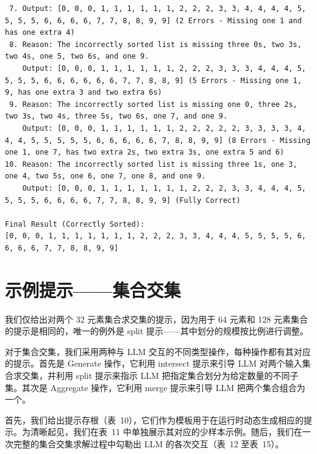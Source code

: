 \documentclass[11pt,UTF8,fontset=fandol]{ctexart}
\begin{document}
\begin{lstlisting}
 7. Output: [0, 0, 0, 1, 1, 1, 1, 1, 1, 2, 2, 2, 3, 3, 4, 4, 4, 4, 5, 5, 5, 5, 6, 6, 6, 6, 7, 7, 8, 8, 9, 9] (2 Errors - Missing one 1 and has one extra 4)
 8. Reason: The incorrectly sorted list is missing three 0s, two 3s, two 4s, one 5, two 6s, and one 9.
    Output: [0, 0, 0, 1, 1, 1, 1, 1, 1, 2, 2, 2, 3, 3, 3, 4, 4, 4, 5, 5, 5, 5, 6, 6, 6, 6, 6, 6, 7, 7, 8, 8, 9] (5 Errors - Missing one 1, 9, has one extra 3 and two extra 6s)
 9. Reason: The incorrectly sorted list is missing one 0, three 2s, two 3s, two 4s, three 5s, two 6s, one 7, and one 9.
    Output: [0, 0, 0, 1, 1, 1, 1, 1, 1, 2, 2, 2, 2, 2, 3, 3, 3, 3, 4, 4, 4, 5, 5, 5, 5, 5, 6, 6, 6, 6, 6, 7, 8, 8, 9, 9] (8 Errors - Missing one 1, one 7, has two extra 2s, two extra 3s, one extra 5 and 6)
10. Reason: The incorrectly sorted list is missing three 1s, one 3, one 4, two 5s, one 6, one 7, one 8, and one 9.
    Output: [0, 0, 0, 1, 1, 1, 1, 1, 1, 1, 2, 2, 2, 3, 3, 4, 4, 4, 5, 5, 5, 5, 6, 6, 6, 6, 7, 7, 8, 8, 9, 9] (Fully Correct)

Final Result (Correctly Sorted):
[0, 0, 0, 1, 1, 1, 1, 1, 1, 1, 2, 2, 2, 3, 3, 4, 4, 4, 5, 5, 5, 5, 6, 6, 6, 6, 7, 7, 8, 8, 9, 9]
\end{lstlisting}

\section{示例提示——集合交集}

我们仅给出对两个 32 元素集合求交集的提示，因为用于 64 元素和 128 元素集合的提示是相同的，唯一的例外是 split 提示——其中划分的规模按比例进行调整。

对于集合交集，我们采用两种与 LLM 交互的不同类型操作，每种操作都有其对应的提示。首先是 Generate 操作，它利用 intersect 提示来引导 LLM 对两个输入集合求交集，并利用 split 提示来指示 LLM 把指定集合划分为给定数量的不同子集。其次是 Aggregate 操作，它利用 merge 提示来引导 LLM 把两个集合组合为一个。

首先，我们给出提示存根（表~10），它们作为模板用于在运行时动态生成相应的提示。为清晰起见，我们在表~11 中单独展示其对应的少样本示例。随后，我们在一次完整的集合交集求解过程中勾勒出 LLM 的各次交互（表~12 至表~15）。
\end{document}
